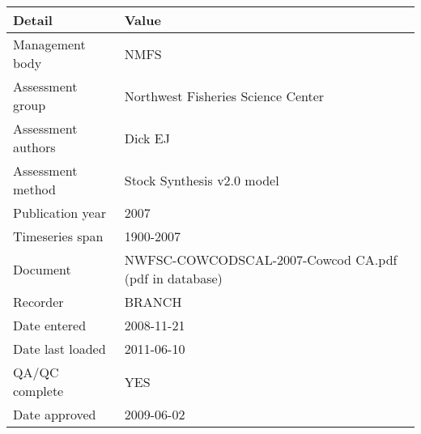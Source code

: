 \begin{table}[htb]
\centering
\begin{tabular}{lp{7cm}}
\toprule
Detail & Value \\
\midrule
Management body    & NMFS                                                  \\
Assessment group   & Northwest Fisheries Science Center                    \\
Assessment authors & Dick EJ                                               \\
Assessment method  & Stock Synthesis v2.0 model                            \\
Publication year   & 2007                                                  \\
Timeseries span    & 1900-2007                                             \\
Document           & NWFSC-COWCODSCAL-2007-Cowcod CA.pdf (pdf in database) \\
Recorder           & BRANCH                                                \\
Date entered       & 2008-11-21                                            \\
Date last loaded   & 2011-06-10                                            \\
QA/QC complete     & YES                                                   \\
Date approved      & 2009-06-02                                            \\
\bottomrule
\end{tabular}
\label{tab:assessdet}
\end{table}
